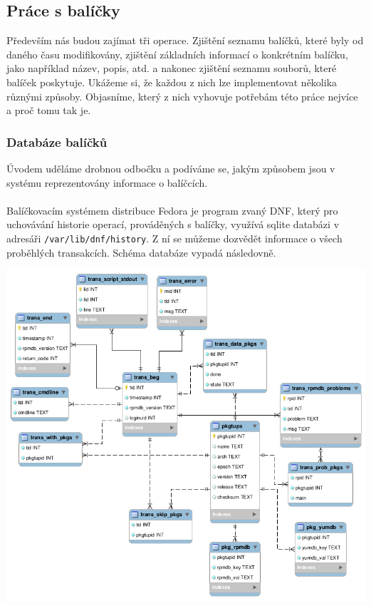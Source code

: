 \documentclass[
  field=inf,
  biblatex,
  glossaries,
  index
]{kidiplom}
\begin{document}
	\subsection{Práce s balíčky}
		Především nás budou zajímat tři operace. Zjištění seznamu balíčků, které byly od daného času modifikovány, zjištění základních informací o konkrétním balíčku, jako například název, popis, atd. a nakonec zjištění seznamu souborů, které balíček poskytuje. Ukážeme si, že každou z nich lze implementovat několika různými způsoby. Objasníme, který z nich vyhovuje potřebám této práce nejvíce a proč tomu tak je.

		\subsubsection{Databáze balíčků}
		Úvodem uděláme drobnou odbočku a podíváme se, jakým způsobem jsou v systému reprezentovány informace o balíčcích.
		\\
		\\
		Balíčkovacím systémem distribuce Fedora je program zvaný DNF\@, který pro uchovávání historie operací, prováděných s balíčky, využívá sqlite databázi v adresáři \texttt{/var/lib/dnf/history}. Z ní se můžeme dozvědět informace o všech proběhlých transakcích. Schéma databáze vypadá následovně.

		\centerline{\includegraphics[scale=0.45]{images/dnf-database.png}}
\end{document}

